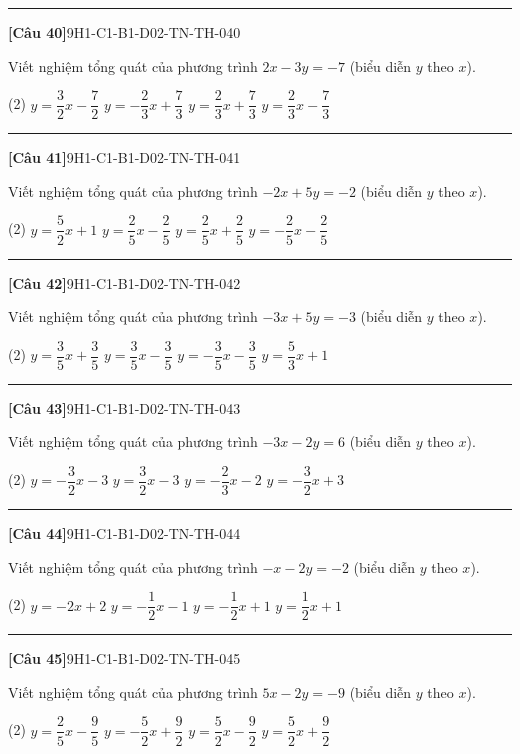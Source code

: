 \documentclass[12pt,a4paper]{article}
\newif\ifloigiai
\newenvironment{cauhoi}[2]{%
  \par\medskip\noindent\rule{\textwidth}{0.4pt}\par\nopagebreak
  \noindent\textbf{[#1]}\hfill{\scriptsize\ttfamily #2}\par\nopagebreak\smallskip}{\par}
\newcommand{\dapan}[1]{\ifloigiai\par\smallskip\noindent\textit{Đáp án:} \textbf{#1}\par\fi}
\begin{document}
\begin{cauhoi}{Câu 40}{9H1-C1-B1-D02-TN-TH-040}
Viết nghiệm tổng quát của phương trình $2x-3y=-7$ (biểu diễn $y$ theo $x$).
\begin{tasks}(2)
\task $y=\dfrac{3}{2}x-\dfrac{7}{2}$
\task $y=-\dfrac{2}{3}x+\dfrac{7}{3}$
\task $y=\dfrac{2}{3}x+\dfrac{7}{3}$
\task $y=\dfrac{2}{3}x-\dfrac{7}{3}$
\end{tasks}
\dapan{C}
\end{cauhoi}
\begin{cauhoi}{Câu 41}{9H1-C1-B1-D02-TN-TH-041}
Viết nghiệm tổng quát của phương trình $-2x+5y=-2$ (biểu diễn $y$ theo $x$).
\begin{tasks}(2)
\task $y=\dfrac{5}{2}x+1$
\task $y=\dfrac{2}{5}x-\dfrac{2}{5}$
\task $y=\dfrac{2}{5}x+\dfrac{2}{5}$
\task $y=-\dfrac{2}{5}x-\dfrac{2}{5}$
\end{tasks}
\dapan{B}
\end{cauhoi}
\begin{cauhoi}{Câu 42}{9H1-C1-B1-D02-TN-TH-042}
Viết nghiệm tổng quát của phương trình $-3x+5y=-3$ (biểu diễn $y$ theo $x$).
\begin{tasks}(2)
\task $y=\dfrac{3}{5}x+\dfrac{3}{5}$
\task $y=\dfrac{3}{5}x-\dfrac{3}{5}$
\task $y=-\dfrac{3}{5}x-\dfrac{3}{5}$
\task $y=\dfrac{5}{3}x+1$
\end{tasks}
\dapan{B}
\end{cauhoi}
\begin{cauhoi}{Câu 43}{9H1-C1-B1-D02-TN-TH-043}
Viết nghiệm tổng quát của phương trình $-3x-2y=6$ (biểu diễn $y$ theo $x$).
\begin{tasks}(2)
\task $y=-\dfrac{3}{2}x-3$
\task $y=\dfrac{3}{2}x-3$
\task $y=-\dfrac{2}{3}x-2$
\task $y=-\dfrac{3}{2}x+3$
\end{tasks}
\dapan{A}
\end{cauhoi}
\begin{cauhoi}{Câu 44}{9H1-C1-B1-D02-TN-TH-044}
Viết nghiệm tổng quát của phương trình $-x-2y=-2$ (biểu diễn $y$ theo $x$).
\begin{tasks}(2)
\task $y=-2x+2$
\task $y=-\dfrac{1}{2}x-1$
\task $y=-\dfrac{1}{2}x+1$
\task $y=\dfrac{1}{2}x+1$
\end{tasks}
\dapan{C}
\end{cauhoi}
\begin{cauhoi}{Câu 45}{9H1-C1-B1-D02-TN-TH-045}
Viết nghiệm tổng quát của phương trình $5x-2y=-9$ (biểu diễn $y$ theo $x$).
\begin{tasks}(2)
\task $y=\dfrac{2}{5}x-\dfrac{9}{5}$
\task $y=-\dfrac{5}{2}x+\dfrac{9}{2}$
\task $y=\dfrac{5}{2}x-\dfrac{9}{2}$
\task $y=\dfrac{5}{2}x+\dfrac{9}{2}$
\end{tasks}
\dapan{D}
\end{cauhoi}
\end{document}
